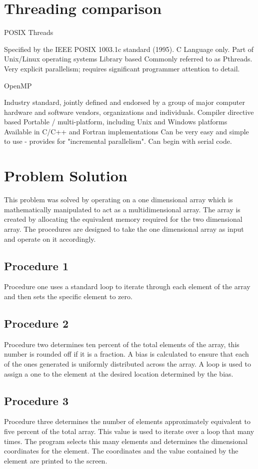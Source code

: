 \documentclass{TechReport}
\begin{document}
 \section{Threading comparison}
 POSIX Threads

    Specified by the IEEE POSIX 1003.1c standard (1995). C Language only.
    Part of Unix/Linux operating systems
    Library based
    Commonly referred to as Pthreads.
    Very explicit parallelism; requires significant programmer attention to detail. 

OpenMP

    Industry standard, jointly defined and endorsed by a group of major computer hardware and software vendors, organizations and 	individuals.
    Compiler directive based
    Portable / multi-platform, including Unix and Windows platforms
    Available in C/C++ and Fortran implementations
    Can be very easy and simple to use - provides for "incremental parallelism". Can begin with serial code. 
 
\section{Problem Solution}
This problem was solved by operating on a one dimensional array which is mathematically manipulated to act as a multidimensional array.  The array is created by allocating the equivalent memory required for the two dimensional array. The procedures are designed to take the one dimensional array as input and operate on it accordingly. 

\subsection{Procedure 1}
Procedure one uses a standard loop to iterate through each element of the array and then sets the specific element to zero.

\subsection{Procedure 2}
Procedure two determines ten percent of the total elements of the array, this number is rounded off if it is a fraction. A bias is calculated to ensure that each of the ones generated is uniformly distributed across the array. A loop is used to assign a one to the element at the desired location determined by the bias.

\subsection{Procedure 3}
Procedure three determines the number of elements approximately equivalent to five percent of the total array. This value is used to iterate over a loop that many times. The program selects this many elements and determines the dimensional coordinates for the element. The coordinates and the value contained by the element are printed to the screen.
\end{document}

